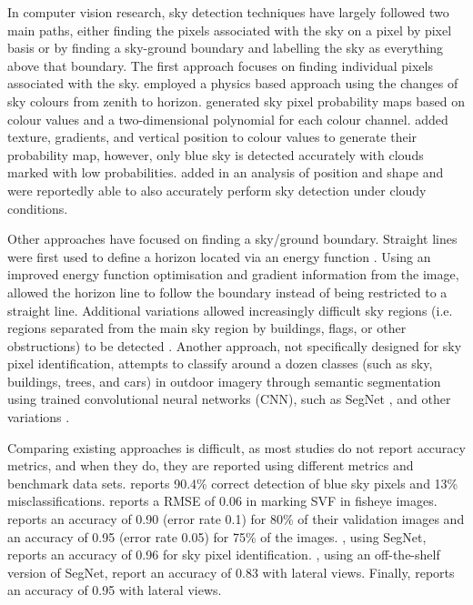 \documentclass[final,3p,times,authoryear]{elsarticle}
\begin{document}
In computer vision research, sky detection techniques have largely followed two main paths, either finding the pixels associated with the sky on a pixel by pixel basis or by finding a sky-ground boundary and labelling the sky as everything above that boundary. The first approach focuses on finding individual pixels associated with the sky. \cite{Luo2002} employed a physics based approach using the changes of sky colours from zenith to horizon. \cite{Gallagher2004} generated sky pixel probability maps based on colour values and a two-dimensional polynomial for each colour channel. \cite{Zafarifar2007} added texture, gradients, and vertical position to colour values to generate their probability map, however, only blue sky is detected accurately with clouds marked with low probabilities. \cite{Schmitt2009} added in an analysis of position and shape and were reportedly able to also accurately perform sky detection under cloudy conditions. 

Other approaches have focused on finding a sky/ground boundary. Straight lines were first used to define a horizon located via an energy function \citep{Ettinger2003}. Using an improved energy function optimisation and gradient information from the image, \cite{Shen2013} allowed the horizon line to follow the boundary instead of being restricted to a straight line. Additional variations allowed increasingly difficult sky regions (i.e. regions separated from the main sky region by buildings, flags, or other obstructions) to be detected \citep{Zhijie2014,Zhijie2015}. Another approach, not specifically designed for sky pixel identification, attempts to classify around a dozen classes (such as sky, buildings, trees, and cars) in outdoor imagery through semantic segmentation using trained convolutional neural networks (CNN), such as SegNet \citep{Badrinarayanan2017}, and other variations \citep{Holder2016,Middel2019}.



Comparing existing approaches is difficult, as most studies do not report accuracy metrics, and when they do, they are reported using different metrics and benchmark data sets. \cite{Luo2002} reports 90.4\% correct detection of blue sky pixels and 13\% misclassifications. \cite{Chapman2004} reports a RMSE of 0.06 in marking SVF in fisheye images. \cite{Schmitt2009} reports an accuracy of 0.90 (error rate 0.1) for 80\% of their validation images and an accuracy of 0.95 (error rate 0.05) for 75\% of the images. \cite{Liang2017}, using SegNet, reports an accuracy of 0.96 for sky pixel identification. \cite{Shen2018}, using an off-the-shelf version of SegNet, report an accuracy of 0.83 with lateral views. Finally, \cite{Middel2019} reports an accuracy of 0.95 with lateral views.
\end{document}

